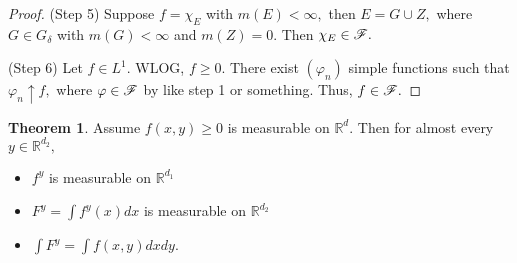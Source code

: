 \documentclass[10pt, oneside]{article}
\newcommand{\bbR}{\mathbb{R}}
\theoremstyle{definition}
\newtheorem{thm}{Theorem}
\begin{document}
\begin{proof}
(Step 5) Suppose $f = \chi_E$ with $m(E)< \infty,$ then $E = G \cup Z,$ where $G\in G_\delta$ with $m(G)< \infty$ and $m(Z) = 0.$ Then $\chi_E \in \cal F.$ 

(Step 6) Let $f\in L^1.$ WLOG, $f\geq 0.$ There exist $(\varphi_n)$ simple functions such that $\varphi_n \uparrow f,$ where $\varphi \in \cal F$ by like step 1 or something. Thus, $f\in \cal F.$
\end{proof}

\begin{thm}
    Assume $f(x,y) \geq 0$ is measurable on $\bbR^d.$ Then for almost every $y \in \bbR^{d_2},$ 
    \begin{itemize}
        \item $f^y$ is measurable on $\bbR^{d_1}$
        \item $F^y = \int f^y(x) dx$ is measurable on $\bbR^{d_2}$
        \item $\int F^y  = \int f(x,y)dxdy.$
    \end{itemize}
\end{thm}
\end{document}
